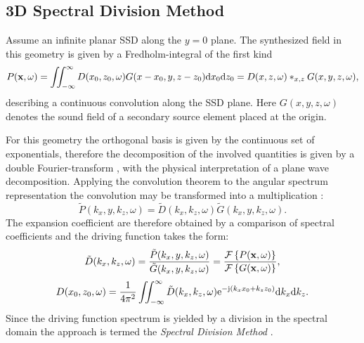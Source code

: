 \subsection{3D Spectral Division Method}
Assume an infinite planar SSD along the $y = 0$ plane.
The synthesized field in this geometry is given by a Fredholm-integral of the first kind 
\begin{equation}
P(\mathbf{x},\omega) = \iint_{-\infty}^{\infty} D(x_0,z_0,\omega) G(x-x_0,y,z-z_0) \mathrm{d} x_0 \mathrm{d} z_0 = D(x,z,\omega)\ast_{x,z} G(x,y,z,\omega),
\end{equation}
describing a continuous convolution along the SSD plane.
Here $G(x,y,z,\omega)$ denotes the sound field of a secondary source element placed at the origin.

For this geometry the orthogonal basis is given by the continuous set of exponentials, therefore the decomposition of the involved quantities is given by a double Fourier-transform \cite{Ahrens2012, Arfken2005,Schultz2014:Comparing_approaches}, with the physical interpretation of a plane wave decomposition.
Applying the convolution theorem to the angular spectrum representation the convolution may be transformed into a multiplication \cite{Girod2001}:
\begin{equation}
\tilde{P}(k_x,y,k_z, \omega) = \tilde{D}(k_x,k_z, \omega)  \tilde{G}(k_x,y,k_z, \omega).
\end{equation}
%
The expansion coefficient are therefore obtained by a comparison of spectral coefficients and the driving function takes the form:
\begin{equation}
\tilde{D}(k_x,k_z,\omega) = \frac{\tilde{P}(k_x,y,k_z, \omega)}{ \tilde{G}(k_x,y,k_z, \omega)} = 
\frac{\mathcal{F}\left\{ P(\mathbf{x},\omega) \right\} }
{  \mathcal{F}\left\{ G(\mathbf{x},\omega) \right\} },
\label{Eq:Theory:Dkxkz}
\end{equation}
\begin{equation}
D(x_0,z_0,\omega) = \frac{1}{4\pi^2} \iint_{-\infty}^{\infty} \tilde{D}(k_x,k_z, \omega) \mathrm{e}^{-\mathrm{j} (k_x x_0 + k_z z_0)} \mathrm{d} k_x \mathrm{d} k_z.
\label{Eq:Theory:Dkx_inverse_Fourier}
\end{equation}
Since the driving function spectrum is yielded by a division in the spectral domain the approach is termed the \emph{Spectral Division Method} \cite{Ahrens2010a, Ahrens2012:Ambisonics_for_planar_linear, Ahrens2011:icassp, Ahrens2010:Ambisonics_w_planar_linear}.

